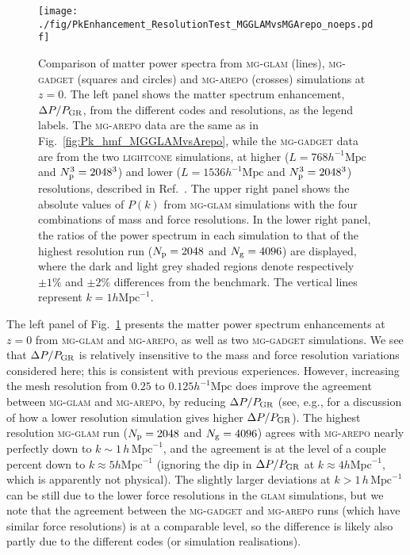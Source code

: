 \begin{figure}
    \centering 
    \texttt{[image: ./fig/PkEnhancement\_ResolutionTest\_MGGLAMvsMGArepo\_noeps.pdf]}
    \caption{
        Comparison of matter power spectra from \textsc{mg-glam} (lines), \textsc{mg-gadget} (squares and circles) and \textsc{mg-arepo} (crosses) simulations at $z=0$. The left panel shows the matter spectrum enhancement, $\Delta P/P_{\rm GR}$, from the different codes and resolutions, as the legend labels. The \textsc{mg-arepo} data are the same as in Fig.~\ref{fig:Pk_hmf_MGGLAMvsArepo}, while the \textsc{mg-gadget} data are from the two \textsc{lightcone} simulations, at higher ($L=768h^{-1}\mathrm{Mpc}$ and $N_{\rm p}^3=2048^3$) and lower ($L=1536h^{-1}\mathrm{Mpc}$ and $N_{\rm p}^3=2048^3$) resolutions, described in Ref.~\cite{Arnold:2018nmv}. The upper right panel shows the absolute values of $P(k)$ from \textsc{mg-glam} simulations with the four combinations of mass and force resolutions. In the lower right panel, the ratios of the power spectrum in each simulation to that of the highest resolution run ($N_{\rm p} = 2048$ and $N_{\rm g} = 4096$) are displayed, where the dark and light grey shaded regions denote respectively $\pm1\%$ and $\pm2\%$ differences from the benchmark. The vertical lines represent $k=1h\mathrm{Mpc}^{-1}$.
    }
    \label{fig:PkEnhancement_ResolutionTest_MGGLAMvsMGArepo}
\end{figure}


The left panel of Fig.~\ref{fig:PkEnhancement_ResolutionTest_MGGLAMvsMGArepo} presents the matter power spectrum enhancements at $z = 0$ from \textsc{mg-glam} and \textsc{mg-arepo}, as well as two \textsc{mg-gadget} simulations. We see that $\Delta P / P_{\rm GR}$ is relatively insensitive to the mass and force resolution variations considered here; this is consistent with previous experiences. However, increasing the mesh resolution from $0.25$ to $0.125h^{-1}\mathrm{Mpc}$ does improve the agreement between \textsc{mg-glam} and \textsc{mg-arepo}, by reducing $\Delta P / P_{\rm GR}$ (see, e.g., \cite{Li:2013MNRAS.428..743L} for a discussion of how a lower resolution simulation gives higher $\Delta P / P_{\rm GR}$). The highest resolution \textsc{mg-glam} run ($N_{\rm p} = 2048$ and $N_{\rm g} = 4096$) agrees with \textsc{mg-arepo} nearly perfectly down to $k \sim 1 \, h \,\mathrm{Mpc}^{-1}$, and the agreement is at the level of a couple percent down to $k\approx5h\mathrm{Mpc}^{-1}$ (ignoring the dip in $\Delta P / P_{\rm GR}$ at $k\approx4h\mathrm{Mpc}^{-1}$, which is apparently not physical). The slightly larger deviations at $k > 1 \, h \,\mathrm{Mpc}^{-1}$ can be still due to the lower force resolutions in the \textsc{glam} simulations, but we note that the agreement between the \textsc{mg-gadget} and \textsc{mg-arepo} runs (which have similar force resolutions) is at a comparable level, so the difference is likely also partly due to the different codes (or simulation realisations).

